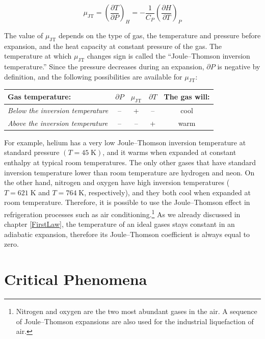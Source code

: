 \documentclass[
  9pt,
]{extbook}
\theoremstyle{definition}
\theoremstyle{definition}
\theoremstyle{definition}
\theoremstyle{remark}
\begin{document}
\begin{equation}
\mu_{\mathrm{JT}}=\left( \frac{\partial T}{\partial P} \right)_H=-\frac{1}{C_P} \left( \frac{\partial H}{\partial T} \right)_P
\label{eq:muJT}
\end{equation}

The value of \(\mu_{\mathrm{JT}}\) depends on the type of gas, the temperature and pressure before expansion, and the heat capacity at constant pressure of the gas. The temperature at which \(\mu_{\mathrm{JT}}\) changes sign is called the ``Joule--Thomson inversion temperature.'' Since the pressure decreases during an expansion, \(\partial P\) is negative by definition, and the following possibilities are available for \(\mu_{\mathrm{JT}}\):

\begin{longtable}[]{@{}lcccc@{}}
\toprule
Gas temperature: & \(\partial P\) & \(\mu_{\mathrm{JT}}\) & \(\partial T\) & The gas will: \\
\midrule
\endhead
\emph{Below the inversion temperature} & -- & + & -- & cool \\
\emph{Above the inversion temperature} & -- & -- & + & warm \\
\bottomrule
\end{longtable}

For example, helium has a very low Joule--Thomson inversion temperature at standard pressure \((T=45\;\text{K})\), and it warms when expanded at constant enthalpy at typical room temperatures. The only other gases that have standard inversion temperature lower than room temperature are hydrogen and neon. On the other hand, nitrogen and oxygen have high inversion temperatures (\(T=621\;\text{K}\) and \(T=764\;\text{K}\), respectively), and they both cool when expanded at room temperature. Therefore, it is possible to use the Joule--Thomson effect in refrigeration processes such as air conditioning.\footnote{Nitrogen and oxygen are the two most abundant gases in the air. A sequence of Joule--Thomson expansions are also used for the industrial liquefaction of air.} As we already discussed in chapter \ref{FirstLaw}, the temperature of an ideal gases stays constant in an adiabatic expansion, therefore its Joule--Thomson coefficient is always equal to zero.

\hypertarget{critical-phenomena}{%
\section{Critical Phenomena}\label{critical-phenomena}}
\end{document}
